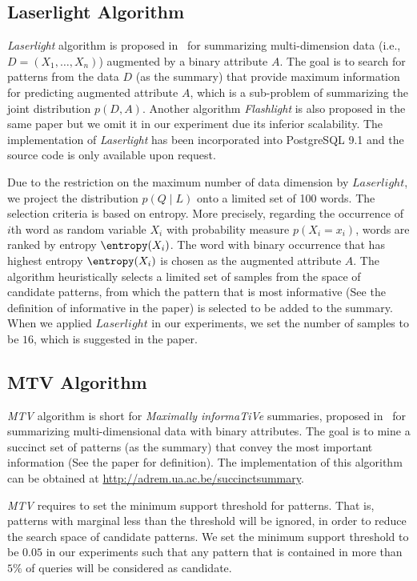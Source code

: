 \subsection{Laserlight Algorithm}
\textit{Laserlight} algorithm is proposed in~\cite{ElGebaly:2014:IIE:2735461.2735467} for summarizing multi-dimension data (i.e., $D=(X_1,\ldots,X_n)$) augmented by a binary attribute $A$. 
The goal is to search for patterns from the data $D$ (as the summary) that provide maximum information for predicting augmented attribute $A$, which is a sub-problem of summarizing the joint distribution $p(D,A)$. 
Another algorithm \textit{Flashlight} is also proposed in the same paper but we omit it in our experiment due its inferior scalability.
The implementation of \textit{Laserlight} has been incorporated into PostgreSQL 9.1 and the source code is only available upon request.

Due to the restriction on the maximum number of data dimension by $Laserlight$, we project the distribution $p(Q\;|\;L)$ onto a limited set of 100 words.
The selection criteria is based on entropy. 
More precisely, regarding the occurrence of $i$th word as random variable $X_i$ with probability measure $p(X_i=x_i)$, words are ranked by entropy $\entropy(X_i)$. 
The word with binary occurrence that has highest entropy $\entropy(X_i)$ is chosen as the augmented attribute $A$.
The algorithm heuristically selects a limited set of samples from the space of candidate patterns, from which the pattern that is most informative (See the definition of informative in the paper) is selected to be added to the summary.
When we applied $Laserlight$ in our experiments, we set the number of samples to be $16$, which is suggested in the paper.

\subsection{MTV Algorithm}
\textit{MTV} algorithm is short for \textit{Maximally informaTiVe} summaries, proposed in~\cite{Mampaey:2012:SDS:2382577.2382580} for summarizing multi-dimensional data with binary attributes. 
The goal is to mine a succinct set of patterns (as the summary) that convey the most important information (See the paper for definition). 
The implementation of this algorithm can be obtained at \href{http://adrem.ua.ac.be/succinctsummary}{http://adrem.ua.ac.be/succinctsummary}.

\textit{MTV} requires to set the minimum support threshold for patterns. That is, patterns with marginal less than the threshold will be ignored, in order to reduce the search space of candidate patterns.
We set the minimum support threshold to be $0.05$ in our experiments such that any pattern that is contained in more than $5\%$ of queries will be considered as candidate.


